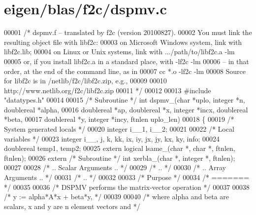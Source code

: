 \hypertarget{eigen_2blas_2f2c_2dspmv_8c_source}{}\section{eigen/blas/f2c/dspmv.c}
\label{eigen_2blas_2f2c_2dspmv_8c_source}

\begin{DoxyCode}
00001 \textcolor{comment}{/* dspmv.f -- translated by f2c (version 20100827).}
00002 \textcolor{comment}{   You must link the resulting object file with libf2c:}
00003 \textcolor{comment}{    on Microsoft Windows system, link with libf2c.lib;}
00004 \textcolor{comment}{    on Linux or Unix systems, link with .../path/to/libf2c.a -lm}
00005 \textcolor{comment}{    or, if you install libf2c.a in a standard place, with -lf2c -lm}
00006 \textcolor{comment}{    -- in that order, at the end of the command line, as in}
00007 \textcolor{comment}{        cc *.o -lf2c -lm}
00008 \textcolor{comment}{    Source for libf2c is in /netlib/f2c/libf2c.zip, e.g.,}
00009 \textcolor{comment}{}
00010 \textcolor{comment}{        http://www.netlib.org/f2c/libf2c.zip}
00011 \textcolor{comment}{*/}
00012 
00013 \textcolor{preprocessor}{#include "datatypes.h"}
00014 
00015 \textcolor{comment}{/* Subroutine */} \textcolor{keywordtype}{int} dspmv\_(\textcolor{keywordtype}{char} *uplo, integer *n, doublereal *alpha, 
00016     doublereal *ap, doublereal *x, integer *incx, doublereal *beta, 
00017     doublereal *y, integer *incy, ftnlen uplo\_len)
00018 \{
00019     \textcolor{comment}{/* System generated locals */}
00020     integer i\_\_1, i\_\_2;
00021 
00022     \textcolor{comment}{/* Local variables */}
00023     integer i\_\_, j, k, kk, ix, iy, jx, jy, kx, ky, info;
00024     doublereal temp1, temp2;
00025     \textcolor{keyword}{extern} logical lsame\_(\textcolor{keywordtype}{char} *, \textcolor{keywordtype}{char} *, ftnlen, ftnlen);
00026     \textcolor{keyword}{extern} \textcolor{comment}{/* Subroutine */} \textcolor{keywordtype}{int} xerbla\_(\textcolor{keywordtype}{char} *, integer *, ftnlen);
00027 
00028 \textcolor{comment}{/*     .. Scalar Arguments .. */}
00029 \textcolor{comment}{/*     .. */}
00030 \textcolor{comment}{/*     .. Array Arguments .. */}
00031 \textcolor{comment}{/*     .. */}
00032 
00033 \textcolor{comment}{/*  Purpose */}
00034 \textcolor{comment}{/*  ======= */}
00035 
00036 \textcolor{comment}{/*  DSPMV  performs the matrix-vector operation */}
00037 
00038 \textcolor{comment}{/*     y := alpha*A*x + beta*y, */}
00039 
00040 \textcolor{comment}{/*  where alpha and beta are scalars, x and y are n element vectors and */}

\end{DoxyCode}
